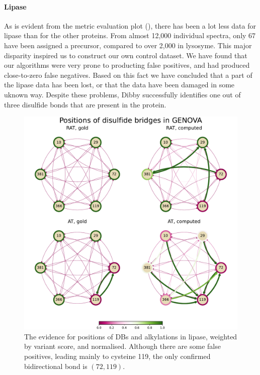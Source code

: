
\paragraph{Lipase} As is evident from the metric evaluation plot (), there has been a lot less data for lipase than for the other proteins. From almost 12,000 individual spectra, only 67 have been assigned a precursor, compared to over 2,000 in lysosyme. This major disparity inspired us to construct our own control dataset. We have found that our algorithms were very prone to producting false positives, and had produced close-to-zero false negatives. Based on this fact we have concluded that a part of the lipase data has been lost, or that the data have been damaged in some uknown way. Despite these problems, Dibby successfully identifies one out of three disulfide bonds that are present in the protein.


\begin{figure}
  \centering
  \includegraphics[width=1\linewidth]{img/genova.pdf}
  \caption{The evidence for positions of DBs and alkylations in lipase, weighted by variant score, and normalised. Although there are some false positives, leading mainly to cysteine 119, the only confirmed bidirectional bond is \((72, 119)\). }\label{fig:genova}
\end{figure}

